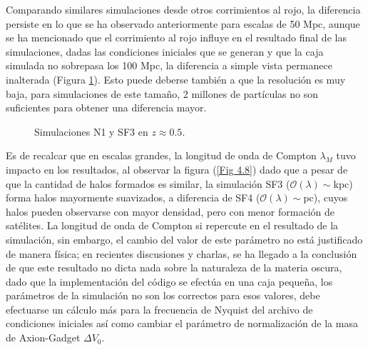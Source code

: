 \documentclass[a4paper,openright,12pt]{book}
\begin{document}
Comparando similares simulaciones desde otros corrimientos al rojo, la diferencia persiste en lo que se ha observado anteriormente para escalas de 50 Mpc, aunque se ha mencionado que el corrimiento al rojo influye en el resultado final de las simulaciones, dadas las condiciones iniciales que se generan y que la caja simulada no sobrepasa los 100 Mpc, la diferencia a simple vista permanece inalterada (Figura \ref{Fig 4.7}). Esto puede deberse también a que la resolución es muy baja, para simulaciones de este tamaño, 2 millones de partículas no son suficientes para obtener una diferencia mayor.

\begin{figure}
\centering
{}
\caption{\footnotesize{Simulaciones N1 y SF3 en $z\approx0.5$.}}\label{Fig 4.7}
\end{figure}
Es de recalcar que en escalas grandes, la longitud de onda de Compton $\lambda_{M}$ tuvo impacto en los resultados, al observar la figura (\ref{Fig 4.8}) dado que a pesar de que la cantidad de halos formados es similar, la simulación SF3 ($\mathcal{O}(\lambda)\sim$kpc) forma halos mayormente suavizados, a diferencia de SF4 ($\mathcal{O}(\lambda)\sim$pc), cuyos halos pueden observarse con mayor densidad, pero con menor formación de satélites. La longitud de onda de Compton si repercute en el resultado de la simulación, sin embargo, el cambio del valor de este parámetro no está justificado de manera física; en recientes discusiones y charlas, se ha llegado a la conclusión de que este resultado no dicta nada sobre la naturaleza de la materia oscura, dado que la implementación del código se efectúa en una caja pequeña, los parámetros de la simulación no son los correctos para esos valores, debe efectuarse un cálculo más para la frecuencia de Nyquist del archivo de condiciones iniciales así como cambiar el parámetro de normalización de la masa de Axion-Gadget $\Delta V_{0}$.
\end{document}

